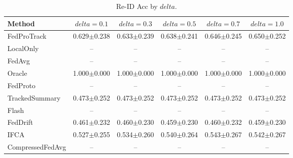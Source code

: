 \begin{table}[t]
\centering
\caption{Re-ID Acc by $delta$.}
\label{tab:delta_concept_re_id_accuracy}
\begin{tabular}{lccccc}
\toprule
Method & $delta=0.1$ & $delta=0.3$ & $delta=0.5$ & $delta=0.7$ & $delta=1.0$ \\
\midrule
FedProTrack & 0.629$\pm$0.238 & 0.633$\pm$0.239 & 0.638$\pm$0.241 & 0.646$\pm$0.245 & 0.650$\pm$0.252 \\
LocalOnly & -- & -- & -- & -- & -- \\
FedAvg & -- & -- & -- & -- & -- \\
Oracle & 1.000$\pm$0.000 & 1.000$\pm$0.000 & 1.000$\pm$0.000 & 1.000$\pm$0.000 & 1.000$\pm$0.000 \\
FedProto & -- & -- & -- & -- & -- \\
TrackedSummary & 0.473$\pm$0.252 & 0.473$\pm$0.252 & 0.473$\pm$0.252 & 0.473$\pm$0.252 & 0.473$\pm$0.252 \\
Flash & -- & -- & -- & -- & -- \\
FedDrift & 0.461$\pm$0.232 & 0.460$\pm$0.230 & 0.459$\pm$0.230 & 0.460$\pm$0.232 & 0.459$\pm$0.230 \\
IFCA & 0.527$\pm$0.255 & 0.534$\pm$0.260 & 0.540$\pm$0.264 & 0.543$\pm$0.267 & 0.542$\pm$0.267 \\
CompressedFedAvg & -- & -- & -- & -- & -- \\
\bottomrule
\end{tabular}
\end{table}